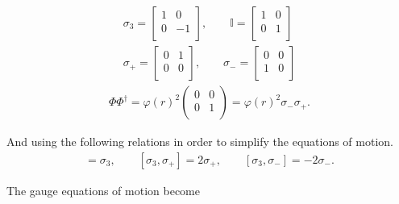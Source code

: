     \begin{align}
        \sigma_3 = \begin{bmatrix}
            1 & 0 \\
            0 & -1 \\
        \end{bmatrix}, \qquad \mathbb{I}= \begin{bmatrix}
            1 & 0\\
            0 & 1\\
        \end{bmatrix} \\
        \sigma_+ =\begin{bmatrix}
            0 & 1\\
            0 & 0\\
        \end{bmatrix}, \qquad \sigma_- = \begin{bmatrix}
            0 &0\\
            1 &0\\
        \end{bmatrix}
    \end{align}
    \begin{align}
        \Phi \Phi^{\dag} = \varphi(r)^2 \begin{pmatrix} 
            0 & 0\\
            0 & 1\\
        \end{pmatrix} = \varphi(r)^2 \sigma_- \sigma_+.
    \end{align}

    And using the following relations in order to simplify the equations of motion.
    \begin{align}
        [\sigma_+, \sigma_-] = \sigma_3, \qquad [\sigma_3, \sigma_+] = 2 \sigma_+, \qquad [\sigma_3, \sigma_-] = -2 \sigma_-.
    \end{align}

    The gauge equations of motion become


